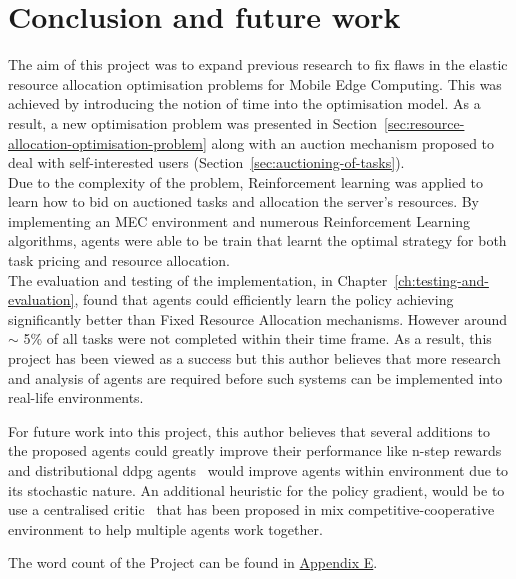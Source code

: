 \chapter{Conclusion and future work}
\label{ch:conclusion-and-future-work}
The aim of this project was to expand previous research to fix flaws in the elastic resource allocation optimisation
problems for Mobile Edge Computing. This was achieved by introducing the notion of time into the optimisation
model. As a result, a new optimisation problem was presented in Section~\ref{sec:resource-allocation-optimisation-problem}
along with an auction mechanism proposed to deal with self-interested users (Section~\ref{sec:auctioning-of-tasks}). \\
Due to the complexity of the problem, Reinforcement learning was applied to learn how to bid on auctioned tasks and
allocation the server's resources. By implementing an MEC environment and numerous Reinforcement Learning algorithms,
agents were able to be train that learnt the optimal strategy for both task pricing and resource allocation. \\
The evaluation and testing of the implementation, in Chapter~\ref{ch:testing-and-evaluation}, found that agents could
efficiently learn the policy achieving significantly better than Fixed Resource Allocation mechanisms.
However around $\sim$ 5\% of all tasks were not completed within their time frame. As a result, this project has been
viewed as a success but this author believes that more research and analysis of agents are required before such systems
can be implemented into real-life environments.

For future work into this project, this author believes that several additions to the proposed agents could greatly
improve their performance like n-step rewards~\citep{multi-step-dqn} and distributional ddpg
agents~\citep{distributional_dqn, d4pg} would improve agents within environment due to its stochastic nature. An
additional heuristic for the policy gradient, would be to use a centralised critic~\citep{maddpg} that has been proposed
in mix competitive-cooperative environment to help multiple agents work together.

The word count of the Project can be found in \hyperref[app:project-management]{Appendix E}.
